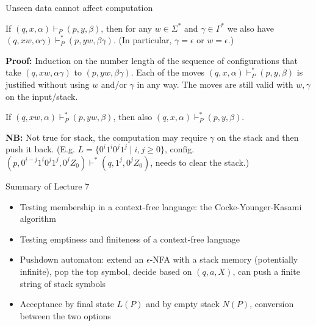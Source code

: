 \documentclass[handout]{beamer}
\begin{document}
\begin{frame}{Unseen data cannot affect computation}

    \begin{lemma}
        If $(q,x,\alpha)\vdash_P (p,y,\beta) $, then for any $w\in \Sigma^*$ and $\gamma\in\Gamma^*$ we also have 
        $(q,xw,\alpha\gamma)\vdash^*_P(p,yw,\beta\gamma)$. (In particular, $\gamma=\epsilon$ or $w=\epsilon$.)
    \end{lemma}
    \textbf{Proof:} Induction on the number length of the sequence of configurations that take $(q,xw,\alpha\gamma)$ to $(p,yw,\beta\gamma)$. Each of the moves $(q,x,\alpha)\vdash^*_P(p,y,\beta)$ is justified without using $w$ and/or $\gamma$ in any way. The moves are still valid with $w,\gamma$ on the input/stack.\hfill\qedsymbol

    \medskip

    \begin{lemma}
        If $(q,xw,\alpha)\vdash^*_P (p,yw,\beta) $, then also $(q,x,\alpha)\vdash^*_P(p,y,\beta)$.
    \end{lemma}
    \textbf{NB:} Not true for stack, the computation may require $\gamma$ on the stack and then push it back. (E.g. $L=\{0^i1^i0^j1^j\mid i,j\geq 0\}$, config. $(p,0^{i-j}1^i0^j1^j,0^jZ_0)\vdash^* (q,1^j,0^jZ_0)$, needs to clear the stack.)

\end{frame}


\begin{frame}{Summary of Lecture 7}
	
	\begin{itemize}    
        \item Testing membership in a context-free language: the Cocke-Younger-Kasami algorithm
        \item Testing emptiness and finiteness of a context-free language    
		\item Pushdown automaton: extend an $\epsilon$-NFA with a stack memory (potentially infinite), pop the top symbol, decide based on $(q,a,X)$, can push a finite string of stack symbols
        \item Acceptance by final state $L(P)$ and by empty stack $N(P)$, conversion between the two options        	
	\end{itemize}

\end{frame}
\end{document}
